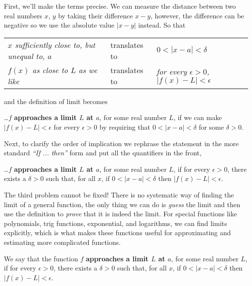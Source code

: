 First, we'll make the terms precise.  We can measure the distance between two real numbers $x$, $y$ by taking their difference $x - y$, however, the difference can be negative so we use the absolute value $|x - y|$ instead.  So that
\begin{center}
	\begin{tabular}{l l l}
		{\it $x$ sufficiently close to, but unequal to, $a$} & translates to & {\it $0 < |x - a| < \delta$}                            \\
		{\it $f(x)$ as close to $L$ as we like}              & translates to & {\it for every $\epsilon > 0$, $|f(x) - L| < \epsilon$}\end{tabular}
\end{center}
and the definition of limit becomes\\
\begin{indentPara}
	\dots $f$ \textbf{approaches a limit $L$ at $a$}, for some real number $L$, if we can make $|f(x) - L| < \epsilon$ for every $\epsilon > 0$ by requiring that $0 < |x - a | < \delta$ for some $\delta > 0$.\\
\end{indentPara}

Next, to clarify the order of implication we rephrase the statement in the more standard {\it ``If ... then''} form and put all the quantifiers in the front,\\
\begin{indentPara}
	\dots $f$ \textbf{approaches a limit $L$ at $a$}, for some real number $L$, if for every $\epsilon > 0$, there exists a $\delta > 0$ such that, for all $x$, if $0 < |x - a | < \delta$ then $|f(x) - L| < \epsilon$.\\
\end{indentPara}


The third problem cannot be fixed! There is no systematic way of finding the limit of a general function, the only thing we can do is {\it guess} the limit and then use the definition to {\it prove} that it is indeed the limit. For special functions like polynomials, trig functions, exponential, and logarithms, we can find limits explicitly, which is what makes these functions useful for approximating and estimating more complicated functions.

\begin{definition}
	\label{def:formal_definition_limit}
	We say that the function $f$ \textbf{approaches a limit $L$ at $a$}, for some real number $L$, if for every $\epsilon > 0$, there exists a $\delta > 0$ such that, for all $x$, if $0 < |x - a | < \delta$ then $|f(x) - L| < \epsilon$.
\end{definition}

